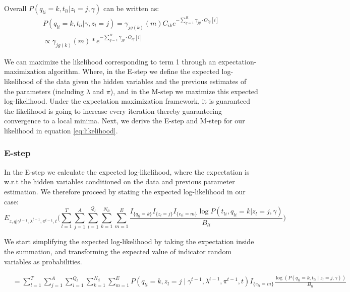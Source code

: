 Overall $P(q_{li} = k, t_{li} | z_l = j, \gamma )$ can be written as: 
\begin{align}
    P(q_{li} = k, t_{li} | \gamma, z_l = j ) = \gamma_{jg(k)}(m)C_{ik}e^{-\sum_{g=1}^R \gamma_{jg}\cdot O_{lg}[i]} \nonumber \\
    \propto \gamma_{jg(k)}(m)*e^{-\sum_{g=1}^R \gamma_{jg}\cdot O_{lg}[i]}
    \label{eq:likelihood}
\end{align}

We can maximize the likelihood corresponding to term 1 through an expectation-maximization algorithm. Where, in the E-step we define the expected log-likelihood of the data given the hidden variables and the previous estimates of the parameters (including $\lambda$ and $\pi$), and in the M-step we maximize this expected log-likelihood. Under the expectation maximization framework, it is guaranteed the likelihood is going to increase every iteration thereby guaranteeing convergence to a local minima. Next, we derive the E-step and M-step for our likelihood in equation \ref{eq:likelihood}.
 
\subsubsection{E-step}

In the E-step we calculate the expected log-likelihood, where the expectation is w.r.t the hidden variables conditioned on the data and previous parameter estimation. We therefore proceed by stating the expected log-likelihood in our case:
\begin{equation}
   E_{z, q | \gamma^{t-1}, \lambda^{t-1}, \pi^{t-1}, t} \Big(  \sum_{l = 1}^T \sum_{j = 1}^A \sum_{i = 1}^{Q_l} \sum_{k =1}^{N_{li}} \sum_{m = 1}^E  \frac{I_{\{q_{l i} = k\}} I_{\{z_l = j\}} I_{\{e_{l i} = m\}} \log P(t_{li}, q_{l i} = k \vert z_l = j, \gamma)}{B_{li}} \Big)
 \end{equation}

We start simplifying the expected log-likelihood by taking the expectation inside the summation, and transforming the expected value of indicator random variables as probabilities.  
\begin{footnotesize}
\begin{align}
    &= \sum_{l = 1}^T \sum_{j = 1}^A  \sum_{i = 1}^{Q_l} \sum_{k =1}^{N_{li}} \sum_{m = 1}^E P(q_{li} = k, z_l = j \mid \gamma^{t-1}, \lambda^{t-1}, \pi^{t-1}, t) I_{\{e_{l i} = m\}} \frac{\log(P(q_{l i} = k, t_{li} \mid z_l = j, \gamma ))}{B_{li}}
\end{align}
\end{footnotesize}

